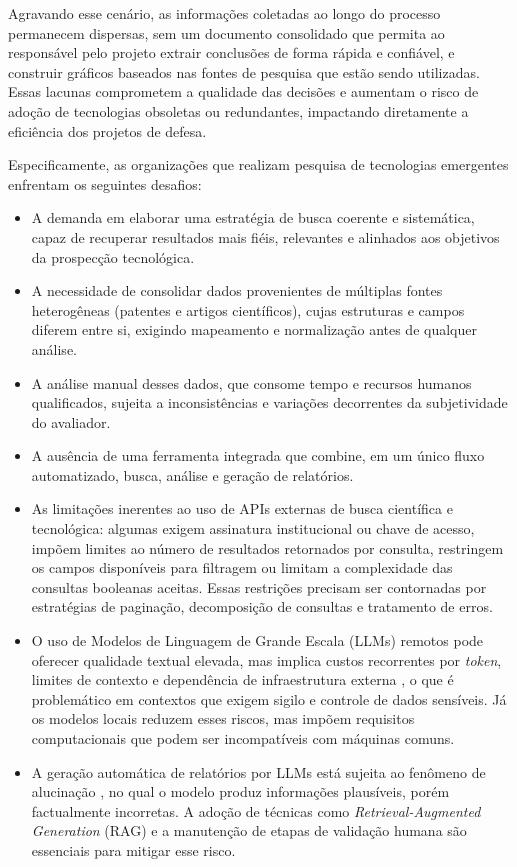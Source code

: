 \documentclass[12pt, a4paper]{article}
\begin{document}
  Agravando esse cenário, as informações coletadas ao longo do processo
permanecem dispersas, sem um documento consolidado que permita ao responsável
pelo projeto extrair conclusões de forma rápida e confiável, e construir gráficos baseados nas fontes de pesquisa que estão sendo utilizadas. Essas
lacunas comprometem a qualidade das decisões e aumentam o risco de adoção de
tecnologias obsoletas ou redundantes, impactando diretamente a eficiência dos
projetos de defesa.

  Especificamente, as organizações que realizam pesquisa de tecnologias
emergentes enfrentam os seguintes desafios:

  \begin{itemize}
    \item A demanda em elaborar uma estratégia de busca coerente e sistemática, capaz de recuperar resultados mais fiéis, relevantes e alinhados aos objetivos da prospecção tecnológica.

    \item A necessidade de consolidar dados provenientes de múltiplas fontes
    heterogêneas (patentes e artigos científicos), cujas estruturas e campos
    diferem entre si, exigindo mapeamento e normalização antes de qualquer análise.

    \item A análise manual desses dados, que consome tempo e recursos humanos
    qualificados, sujeita a inconsistências e variações decorrentes da subjetividade
    do avaliador.

    \item A ausência de uma ferramenta integrada que combine, em um único fluxo
    automatizado, busca, análise e geração de relatórios.

    \item As limitações inerentes ao uso de APIs externas de busca científica e
    tecnológica: algumas exigem assinatura institucional ou chave de acesso, impõem
    limites ao número de resultados retornados por consulta, restringem os campos
    disponíveis para filtragem ou limitam a complexidade das consultas booleanas
    aceitas. Essas restrições precisam ser contornadas por estratégias de paginação,
    decomposição de consultas e tratamento de erros.

    \item O uso de Modelos de Linguagem de Grande Escala (LLMs) remotos pode oferecer
    qualidade textual elevada, mas implica custos recorrentes por \textit{token},
    limites de contexto e dependência de infraestrutura externa \cite{zhao2023},
    o que é problemático em contextos que exigem sigilo e controle de dados sensíveis.
    Já os modelos locais reduzem esses riscos, mas impõem requisitos computacionais
    que podem ser incompatíveis com máquinas comuns.

    \item A geração automática de relatórios por LLMs está sujeita ao fenômeno de
    alucinação \cite{ji2022}, no qual o modelo produz informações plausíveis, porém
    factualmente incorretas. A adoção de técnicas como \textit{Retrieval-Augmented
    Generation} (RAG) e a manutenção de etapas de validação humana são essenciais
    para mitigar esse risco.
  \end{itemize}
\end{document}
